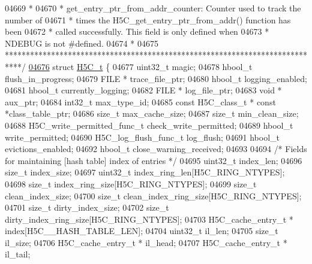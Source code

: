 \begin{DoxyCode}
04669 \textcolor{comment}{ *}
04670 \textcolor{comment}{ * get\_entry\_ptr\_from\_addr\_counter: Counter used to track the number of}
04671 \textcolor{comment}{ *              times the H5C\_get\_entry\_ptr\_from\_addr() function has been}
04672 \textcolor{comment}{ *              called successfully.  This field is only defined when}
04673 \textcolor{comment}{ *              NDEBUG is not #defined.}
04674 \textcolor{comment}{ *}
04675 \textcolor{comment}{ ****************************************************************************/}
\hyperlink{struct_h5_c__t}{04676} \textcolor{keyword}{struct }\hyperlink{struct_h5_c__t}{H5C\_t} \{
04677     uint32\_t            magic;
04678     hbool\_t         flush\_in\_progress;
04679     FILE *          trace\_file\_ptr;
04680     hbool\_t                     logging\_enabled;
04681     hbool\_t                     currently\_logging;
04682     FILE *          log\_file\_ptr;
04683     \textcolor{keywordtype}{void} *          aux\_ptr;
04684     int32\_t         max\_type\_id;
04685     \textcolor{keyword}{const} H5C\_class\_t * \textcolor{keyword}{const}   *class\_table\_ptr;
04686     \textcolor{keywordtype}{size\_t}                      max\_cache\_size;
04687     \textcolor{keywordtype}{size\_t}                      min\_clean\_size;
04688     H5C\_write\_permitted\_func\_t  check\_write\_permitted;
04689     hbool\_t         write\_permitted;
04690     H5C\_log\_flush\_func\_t    log\_flush;
04691     hbool\_t         evictions\_enabled;
04692     hbool\_t         close\_warning\_received;
04693 
04694     \textcolor{comment}{/* Fields for maintaining [hash table] index of entries */}
04695     uint32\_t                    index\_len;
04696     \textcolor{keywordtype}{size\_t}                      index\_size;
04697     uint32\_t            index\_ring\_len[H5C\_RING\_NTYPES];
04698     \textcolor{keywordtype}{size\_t}          index\_ring\_size[H5C\_RING\_NTYPES];
04699     \textcolor{keywordtype}{size\_t}          clean\_index\_size;
04700     \textcolor{keywordtype}{size\_t}          clean\_index\_ring\_size[H5C\_RING\_NTYPES];
04701     \textcolor{keywordtype}{size\_t}          dirty\_index\_size;
04702     \textcolor{keywordtype}{size\_t}          dirty\_index\_ring\_size[H5C\_RING\_NTYPES];
04703     H5C\_cache\_entry\_t *         index[H5C\_\_HASH\_TABLE\_LEN];
04704     uint32\_t                    il\_len;
04705     \textcolor{keywordtype}{size\_t}                      il\_size;
04706     H5C\_cache\_entry\_t *         il\_head;
04707     H5C\_cache\_entry\_t *         il\_tail;

\end{DoxyCode}
